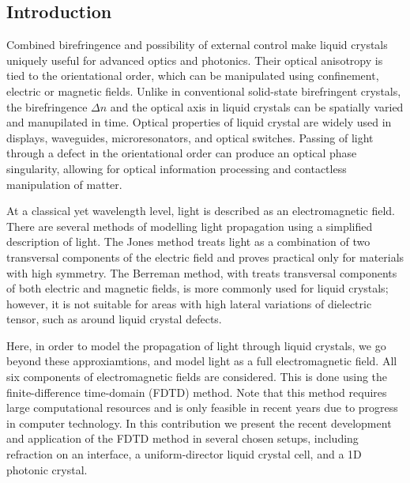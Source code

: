 \documentclass[a4paper,10pt]{article}
\begin{document}
\begin{multicols}{2}

\section{Introduction}

Combined birefringence and possibility of external control make liquid crystals uniquely useful for advanced optics and photonics\cite{optics-lcd}. 
Their optical anisotropy is tied to the orientational order, which can be manipulated using confinement, electric or magnetic fields\cite{ravnik-zumer-ldg}. 
Unlike in conventional solid-state birefringent crystals, the birefringence $\Delta n$ and the optical axis in liquid crystals can be spatially varied and manupilated in time. 
Optical properties of liquid crystal are widely used in displays, waveguides, microresonators, and optical switches\cite{coles-morris,humar-musevic}. 
Passing of light through a defect in the orientational order can produce an optical phase singularity, allowing for optical information processing and contactless manipulation of matter\cite{brasselet-droplet}. 

At a classical yet wavelength level, light is described as an electromagnetic field. 
There are several methods of modelling light propagation using a simplified description of light. 
The Jones method treats light as a combination of two transversal components of the electric field and proves practical only for materials with high symmetry\cite{berreman}. 
The Berreman method, with treats transversal components of both electric and magnetic fields, is more commonly used for liquid crystals;
however, it is not suitable for areas with high lateral variations of dielectric tensor, such as around liquid crystal defects\cite{hwang-rey}. 

Here, in order to model the propagation of light through liquid crystals, we go beyond these approxiamtions, and model light as a full electromagnetic field. All six components of electromagnetic fields are considered. 
This is done using the finite-difference time-domain (\textsc{FDTD}) method\cite{taflove,hwang-rey}. 
Note that this method requires large computational resources and is only feasible in recent years due to progress in computer technology. 
In this contribution we present the recent development and application of the FDTD method in several chosen setups, 
including refraction on an interface, a uniform-director liquid crystal cell, and a 1D photonic crystal. 


\end{multicols}
\end{document}

